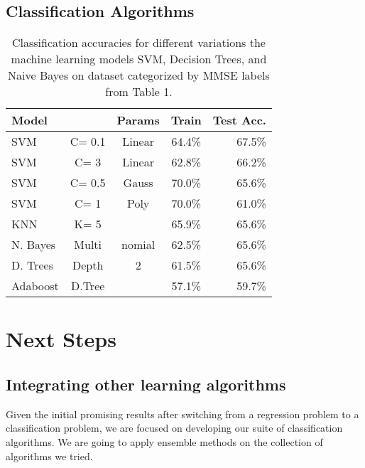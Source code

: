 \documentclass{article}
\begin{document}
\subsection{Classification Algorithms}

\begin{table}[h]
\caption{Classification accuracies for different variations the machine learning models SVM, Decision Trees, and Naive Bayes on dataset categorized by MMSE labels from Table 1.}
\label{sample-table}
\vskip 0.15in
\begin{center}
\begin{small}
\begin{sc}
\begin{tabular}{lcccr}
\hline
\abovespace\belowspace
Model & & Params & Train & Test Acc. \\
\hline
\abovespace
SVM    & C= 0.1 & Linear & 64.4\% & 67.5\% \\
SVM    & C= 3 & Linear & 62.8\% & 66.2\% \\
SVM    & C= 0.5 & Gauss & 70.0\% & 65.6\% \\
SVM    & C= 1 & Poly & 70.0\% & 61.0\% \\
KNN    & K= 5 && 65.9\% & 65.6\% \\
N. Bayes    &Multi & nomial & 62.5\% & 65.6\% \\
D. Trees    &Depth & 2 & 61.5\% & 65.6\% \\
\belowspace
Adaboost    & D.Tree  &  & 57.1\% & 59.7\% \\
\hline
\end{tabular}
\end{sc}
\end{small}
\end{center}
\vskip -0.1in
\end{table}


\section{Next Steps}
\subsection{Integrating other learning algorithms}
Given the initial promising results after switching from a regression problem to a classification problem, we are focused on developing our suite of classification algorithms. We are going to apply ensemble methods on the collection of algorithms we tried.
\end{document}
